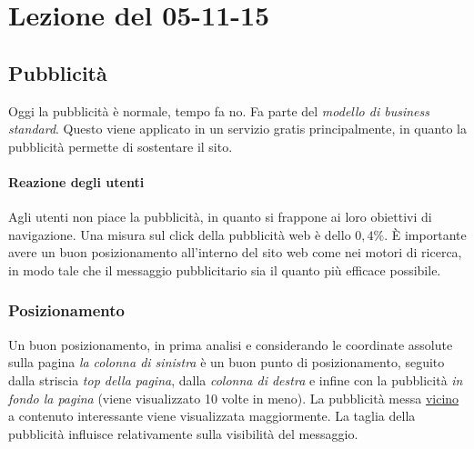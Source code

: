 \section{Lezione del 05-11-15}

\subsection{Pubblicit\`a}

Oggi la pubblicit\`a \`e normale, tempo fa no. Fa parte del \textit{modello di business standard}. Questo viene applicato in un servizio gratis principalmente, in quanto la pubblicit\`a permette di sostentare il sito.

\paragraph*{Reazione degli utenti}Agli utenti non piace la pubblicit\`a, in quanto si frappone ai loro obiettivi di navigazione. Una misura sul click della pubblicit\`a web \`e dello $0,4\%$. \`E importante avere un buon posizionamento all'interno del sito web come nei motori di ricerca, in modo tale che il messaggio pubblicitario sia il quanto pi\`u efficace possibile.

\subsubsection{Posizionamento}Un buon posizionamento, in prima analisi e considerando le coordinate assolute sulla pagina \textit{la colonna di sinistra} \`e un buon punto di posizionamento, seguito dalla striscia\textit{ top della pagina}, dalla \textit{colonna di destra} e infine con la pubblicit\`a \textit{in fondo la pagina} (viene visualizzato 10 volte in meno).
La pubblicit\`a messa \underline{vicino} a contenuto interessante viene visualizzata maggiormente.
La taglia della pubblicit\`a influisce relativamente sulla visibilit\`a del messaggio.

